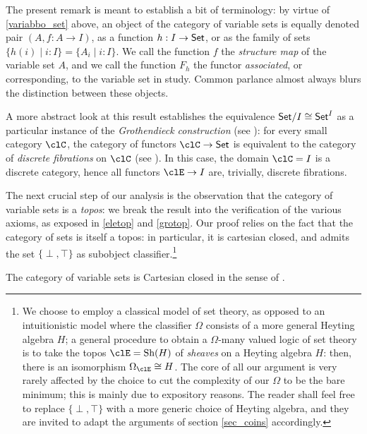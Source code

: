 \begin{notation}
	The present remark is meant to establish a bit of terminology: by virtue of \autoref{variabbo_set} above, an object of the category of variable sets is equally denoted pair $(A,f : A \to I)$, as a function $h : I \to \mathsf{Set}$, or as the family of sets $\{h(i) \mid i : I\} = \{A_i\mid i: I\}$. We call the function $f$ the \emph{structure map} of the variable set $A$, and we call the function $F_h$ the functor \emph{associated}, or corresponding, to the variable set in study. Common parlance almost always blurs the distinction between these objects.
\end{notation}
\begin{remark}
	A more abstract look at this result establishes the equivalence $\mathsf{Set}/I\cong \mathsf{Set}^I$ as a particular instance of the \emph{Grothendieck construction} (see \cite[1.1]{Leinster2004}): for every small category $\clC$, the category of functors $\clC\to\Set$ is equivalent to the category of \emph{discrete fibrations} on $\clC$ (see \cite[1.1]{Leinster2004}). In this case, the domain $\clC=I$ is a discrete category, hence all functors $\clE \to I$ are, trivially, discrete fibrations.
\end{remark}
\begin{remark}
	The next crucial step of our analysis is the observation that the category of variable sets is a \emph{topos}: we break the result into the verification of the various axioms, as exposed in \autoref{eletop} and \autoref{grotop}. Our proof relies on the fact that the category of sets is itself a topos: in particular, it is cartesian closed, and admits the set $\{\perp,\top\}$ as subobject classifier.\footnote{We choose to employ a classical model of set theory, as opposed to an intuitionistic model where the classifier $\Omega$ consists of a more general Heyting algebra $H$; a general procedure to obtain a $\Omega$-many valued logic of set theory is to take the topos $\clE = \text{Sh}(H)$ of \emph{sheaves} on a Heyting algebra $H$: then, there is an isomorphism $\Omega_\clE\cong H$. The core of all our argument is very rarely affected by the choice to cut the complexity of our $\Omega$ to be the bare minimum; this is mainly due to expository reasons. The reader shall feel free to replace $\{\perp,\top\}$ with a more generic choice of Heyting algebra, and they are invited to adapt the arguments of section \autoref{sec_coins} accordingly.}
\end{remark}
\begin{proposition}\label{carclo}
	The category of variable sets is Cartesian closed in the sense of \cite[p.335]{Bor1}.
\end{proposition}
